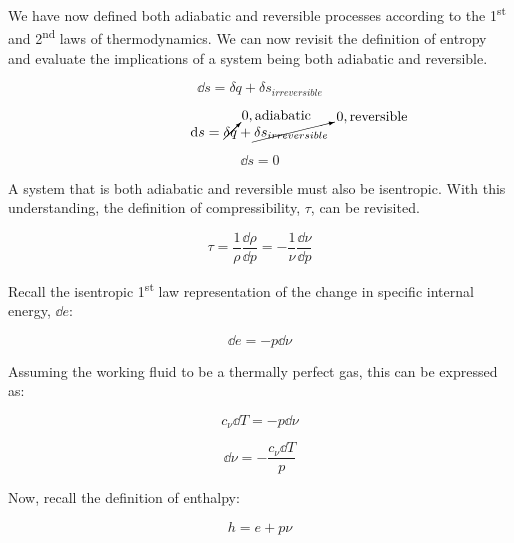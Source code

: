 \documentclass[12pt,letterpaper]{article}
\begin{document}
\begin{enumerate}[label=(\alph*)]
\begin{enumerate}[label=\arabic*.]
					We have now defined both adiabatic and reversible processes according to the 1\textsuperscript{st} and 2\textsuperscript{nd} laws of thermodynamics. We can now revisit the definition of entropy and evaluate the implications of a system being both adiabatic and reversible.
					
					\begin{equation*}
						\dd s = \delta q + \delta s_{irreversible}
					\end{equation*}
				
					\begin{equation*}
						\dd s = \cancelto{0, \mathrm{adiabatic}}{\delta q} + \cancelto{0, \mathrm{reversible}}{\delta s_{irreversible}}				
					\end{equation*}
					
					\begin{equation*}
						\boxed{\dd s = 0}
					\end{equation*}
				
					A system that is both adiabatic and reversible must also be isentropic. With this understanding, the definition of compressibility, $\tau$, can be revisited.
				
					\begin{equation*}
						\tau = \frac{1}{\rho}\frac{\dd \rho}{\dd p} = - \frac{1}{\nu}\frac{\dd\nu}{\dd p}
					\end{equation*}
				
					Recall the isentropic 1\textsuperscript{st} law representation of the change in specific internal energy, $\dd e$:
					
					\begin{equation*}
						\dd e = - p \dd \nu
					\end{equation*}
				
					Assuming the working fluid to be a thermally perfect gas, this can be expressed as:
					
					\begin{equation*}
						c_\nu \dd T= -p \dd \nu
					\end{equation*}
					
					\begin{equation*}
						\boxed{\dd \nu = - \frac{c_{\nu}\dd T}{p}}
					\end{equation*}				
				
					Now, recall the definition of enthalpy:
					
					\begin{equation*}
						h = e + p\nu
					\end{equation*}
					

\end{enumerate}
\end{enumerate}
\end{document}
